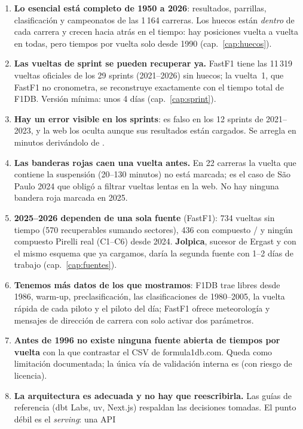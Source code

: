 \documentclass[11pt,openany]{report}
\begin{document}
\begin{enumerate}
  \item \textbf{Lo esencial está completo de 1950 a 2026}: resultados, parrillas, clasificación y
  campeonatos de las 1\,164 carreras. Los huecos están \emph{dentro} de cada carrera y crecen hacia
  atrás en el tiempo: hay posiciones vuelta a vuelta en todas, pero tiempos por vuelta solo desde
  1990 (cap.~\ref{cap:huecos}).
  \item \textbf{Las vueltas de sprint se pueden recuperar ya.} FastF1 tiene las 11\,319 vueltas
  oficiales de los 29 sprints (2021–2026) sin huecos; la vuelta~1, que FastF1 no cronometra, se
  reconstruye exactamente con el tiempo total de F1DB. Versión mínima: unos 4 días
  (cap.~\ref{cap:sprint}).
  \item \textbf{Hay un error visible en los sprints}:  es falso en los
  12 sprints de 2021–2023, y la web los oculta aunque sus resultados están cargados. Se arregla en
  minutos derivándolo de .
  \item \textbf{Las banderas rojas caen una vuelta antes.} En 22 carreras la vuelta que contiene la
  suspensión (20–130 minutos) no está marcada; es el caso de São Paulo 2024 que obligó a filtrar
  vueltas lentas en la web. No hay ninguna bandera roja marcada en 2025.
  \item \textbf{2025–2026 dependen de una sola fuente} (FastF1): 734 vueltas sin tiempo (570
  recuperables sumando sectores), 436 con compuesto / y ningún compuesto
  Pirelli real (C1–C6) desde 2024. \textbf{Jolpica}, sucesor de Ergast y con el mismo esquema que ya
  cargamos, daría la segunda fuente con 1–2 días de trabajo (cap.~\ref{cap:fuentes}).
  \item \textbf{Tenemos más datos de los que mostramos}: F1DB trae libres desde 1986, warm-up,
  preclasificación, las clasificaciones de 1980–2005, la vuelta rápida de cada piloto y el piloto
  del día; FastF1 ofrece meteorología y mensajes de dirección de carrera con solo activar dos
  parámetros.
  \item \textbf{Antes de 1996 no existe ninguna fuente abierta de tiempos por vuelta} con la que
  contrastar el CSV de formula1db.com. Queda como limitación documentada; la única vía de validación
  interna es  (con riesgo de licencia).
  \item \textbf{La arquitectura es adecuada y no hay que reescribirla.} Las guías de referencia (dbt
  Labs, uv, Next.js) respaldan las decisiones tomadas. El punto débil es el \emph{serving}: una API

\end{enumerate}
\end{document}
